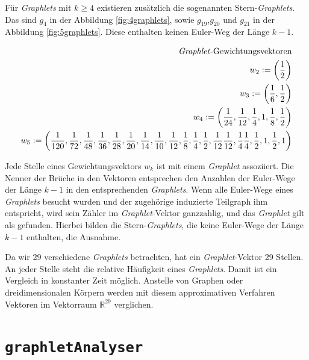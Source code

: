 \documentclass{report}
\begin{document}
F\"ur \textit{Graphlets} mit $k \geq 4$ existieren zus\"atzlich die sogenannten Stern-\textit{Graphlets}. Das sind $g_4$ in der Abbildung \ref{fig:4graphlets}, sowie $g_{19}$,$g_{20}$ und $g_{21}$ in der Abbildung \ref{fig:5graphlets}. Diese enthalten keinen Euler-Weg der L\"ange $k-1$.

\begin{center}
\begin{subequations}
\label{eq:w-vector}
\begin{align*}
\text{\textit{Graphlet}-Gewichtungsvektoren} \\
w_2 := \left( \frac{1}{2} \right) \\
w_3 := \left( \frac{1}{6}, \frac{1}{2} \right) \\
w_4 := \left( \frac{1}{24}, \frac{1}{12}, \frac{1}{4}, 1, \frac{1}{8},\frac{1}{2} \right) \\
w_5 := \left( \frac{1}{120}, \frac{1}{72}, \frac{1}{48}, \frac{1}{36}, \frac{1}{28}, \frac{1}{20}, \frac{1}{14}, \frac{1}{10}, \frac{1}{12}, \frac{1}{8}, \frac{1}{4}, \frac{1}{2}, \frac{1}{12} \frac{1}{12}, \frac{1}{4} \frac{1}{4}, \frac{1}{2}, 1, \frac{1}{2}, 1\right)
\end{align*}
\end{subequations}
\end{center}

Jede Stelle eines Gewichtungsvektors $w_k$ ist mit einem \textit{Graphlet} assoziiert. Die Nenner der Br\"uche in den Vektoren entsprechen den Anzahlen der Euler-Wege der L\"ange $k-1$ in den entsprechenden \textit{Graphlets}. Wenn alle Euler-Wege eines \textit{Graphlets} besucht wurden und der zugeh\"orige induzierte Teilgraph ihm entspricht, wird sein Z\"ahler im \textit{Graphlet}-Vektor ganzzahlig, und das \textit{Graphlet} gilt als gefunden.
Hierbei bilden  die Stern-\textit{Graphlets}, die keine Euler-Wege der L\"ange $k-1$ enthalten, die Ausnahme.
 
Da wir 29 verschiedene \textit{Graphlets} betrachten, hat ein \textit{Graphlet}-Vektor 29 Stellen. An jeder Stelle steht die relative H\"aufigkeit eines \textit{Graphlets}. Damit ist ein Vergleich in konstanter Zeit m\"oglich. Anstelle von Graphen oder dreidimensionalen K\"orpern werden mit diesem approximativen Verfahren Vektoren im Vektorraum $\mathbb{R}^{29}$ verglichen.



\section{\texttt{graphletAnalyser}}
\end{document}
